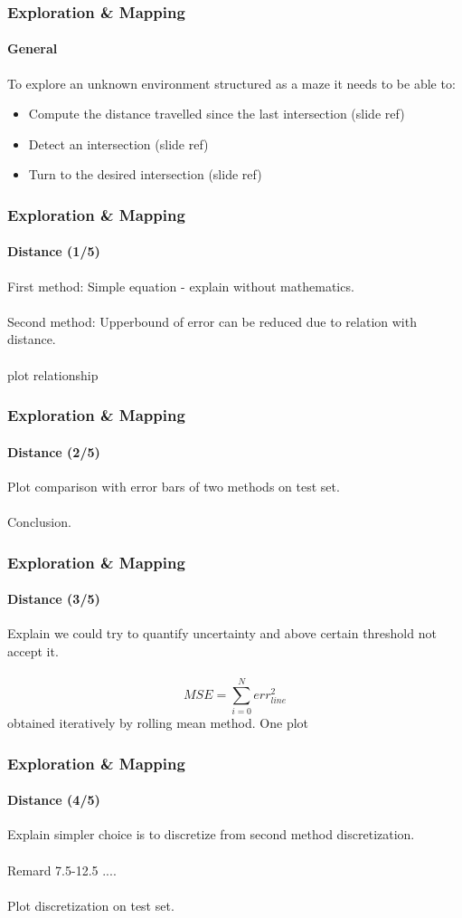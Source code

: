 \documentclass[10pt]{beamer}
\begin{document}
\begin{frame}
\frametitle{Exploration \& Mapping}
\framesubtitle{General}
To explore an unknown environment structured as a maze it needs to be able to:
\begin{itemize}
\item Compute the distance travelled since the last intersection (slide ref)
\item Detect an intersection (slide ref)
\item Turn to the desired intersection (slide ref)
\end{itemize}
\end{frame}


\begin{frame}
\frametitle{Exploration \& Mapping}
\framesubtitle{Distance (1/5)}
First method: Simple equation - explain without mathematics.\\~\\
Second method: Upperbound of error can be reduced due to relation with distance.\\~\\
plot relationship
\end{frame}


\begin{frame}
\frametitle{Exploration \& Mapping}
\framesubtitle{Distance (2/5)}
Plot comparison with error bars of two methods on test set.\\~\\
Conclusion.
\end{frame}


\begin{frame}
\frametitle{Exploration \& Mapping}
\framesubtitle{Distance (3/5)}
Explain we could try to quantify uncertainty and above certain threshold not accept it.\\~\\
$$
	MSE = \sum_{i=0}^N err_{line}^2
$$
obtained iteratively by rolling mean method.
One plot 
\end{frame}


\begin{frame}
\frametitle{Exploration \& Mapping}
\framesubtitle{Distance (4/5)}
Explain simpler choice is to discretize from second method discretization.\\~\\
Remard 7.5-12.5 ....\\~\\
Plot discretization on test set.
\end{frame}
\end{document}
